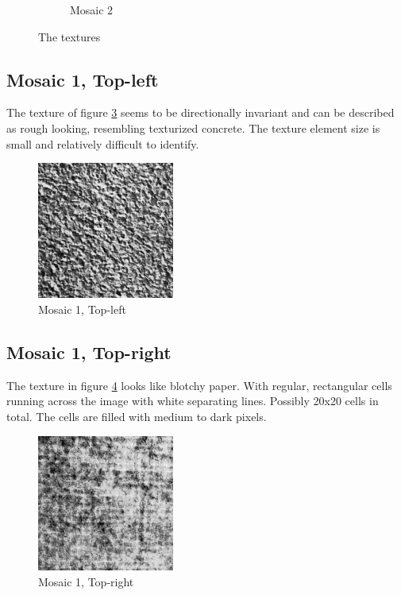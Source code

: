 \documentclass[a4paper,12pt,titlepage]{article}
\begin{document}
\begin{figure}[H]
\begin{subfigure}{0.5\textwidth}
\caption{Mosaic 2}
\label{fig:Mosaic2}
\end{subfigure}

\caption{The textures}
\label{fig:Textures}
\end{figure}

\subsection*{Mosaic 1, Top-left}
The texture of figure \ref{fig:Mosaic1TextureTopLeft} seems to be directionally invariant and can be described as rough looking, resembling texturized concrete. The texture element size is small and relatively difficult to identify.

\begin{figure}[H]
\includegraphics[width=0.4\textwidth]{textures/mosaic1-subimage-top-left}
\caption{Mosaic 1, Top-left}
\label{fig:Mosaic1TextureTopLeft}
\end{figure}

\subsection*{Mosaic 1, Top-right}
The texture in figure \ref{fig:Mosaic1TextureTopRight} looks like blotchy paper. With regular, rectangular cells running across the image with white separating lines. Possibly 20x20 cells in total. The cells are filled with medium to dark pixels.

\begin{figure}[H]
\includegraphics[width=0.4\textwidth]{textures/mosaic1-subimage-top-right}
\caption{Mosaic 1, Top-right}
\label{fig:Mosaic1TextureTopRight}
\end{figure}
\end{document}
